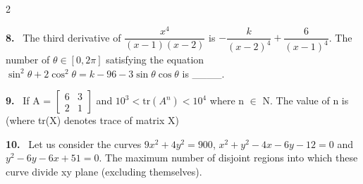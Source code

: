 \documentclass[10pt]{extarticle}
\newcommand{\qn}[1]{\par\smallskip\noindent\textbf{#1.}~}
\begin{document}
\begin{multicols}{2}
\qn{8} The third derivative of $\dfrac{x^4}{(x-1)(x-2)}$ is $-\dfrac{k}{(x-2)^4}+\dfrac{6}{(x-1)^4}$. The number of $\theta\in[0,2\pi]$ satisfying the equation $\sin^2\theta+2\cos^2\theta=k-96-3\sin\theta\cos\theta$ is \_\_\_\_.
\qn{9} If A = $\begin{bmatrix}6&3\\2&1\end{bmatrix}$ and $10^3<\text{tr}(A^n)<10^4$ where n $\in$ N. The value of n is (where tr(X) denotes trace of matrix X)
\qn{10} Let us consider the curves $9x^2+4y^2=900$, $x^2+y^2-4x-6y-12=0$ and $y^2-6y-6x+51=0$. The maximum number of disjoint regions into which these curve divide xy plane (excluding themselves).
\end{multicols}
\end{document}
